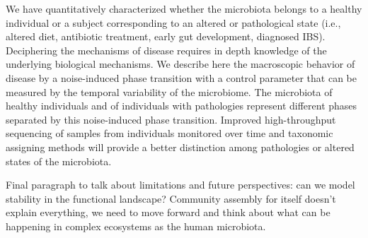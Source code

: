 We have quantitatively characterized whether the microbiota belongs to a healthy individual or a subject corresponding to an altered or pathological state (i.e., altered diet, antibiotic treatment, early gut development, diagnosed IBS). Deciphering the mechanisms of disease requires in depth knowledge of the underlying biological mechanisms. We describe here the macroscopic behavior of disease by a noise-induced phase transition with a control parameter that can be measured by the temporal variability of the microbiome. The microbiota of healthy individuals and of individuals with pathologies represent different phases separated by this noise-induced phase transition. Improved high-throughput sequencing of samples from individuals monitored over time and taxonomic assigning methods will provide a better distinction among pathologies or altered states of the microbiota.

Final paragraph to talk about limitations and future perspectives: can we model stability in the functional landscape? Community assembly for itself doesn't explain everything, we need to move forward and think about what can be happening in complex ecosystems as the human microbiota. 